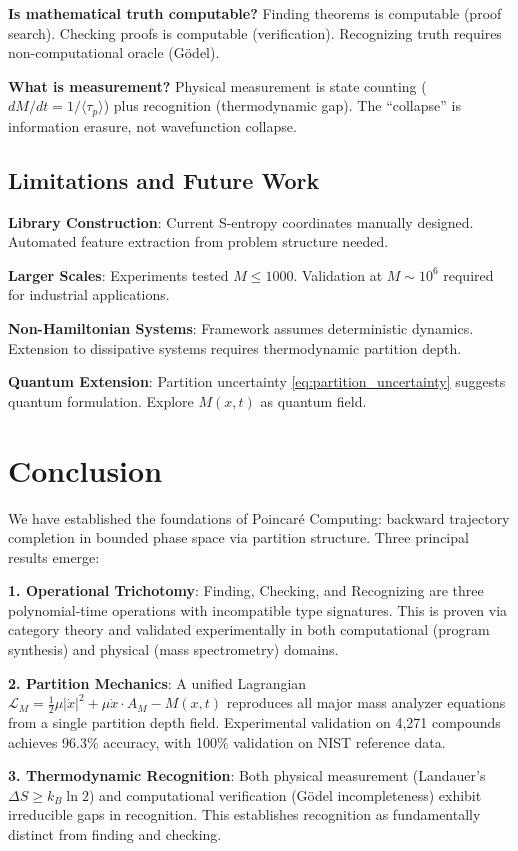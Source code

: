 \documentclass[twocolumn,aps,prl,superscriptaddress,floatfix]{revtex4-2}
\begin{document}
\textbf{Is mathematical truth computable?} Finding theorems is computable (proof search). Checking proofs is computable (verification). Recognizing truth requires non-computational oracle (G\"odel).

\textbf{What is measurement?} Physical measurement is state counting ($dM/dt = 1/\langle \tau_p \rangle$) plus recognition (thermodynamic gap). The ``collapse'' is information erasure, not wavefunction collapse.

\subsection{Limitations and Future Work}

\textbf{Library Construction}: Current S-entropy coordinates manually designed. Automated feature extraction from problem structure needed.

\textbf{Larger Scales}: Experiments tested $M \leq 1000$. Validation at $M \sim 10^6$ required for industrial applications.

\textbf{Non-Hamiltonian Systems}: Framework assumes deterministic dynamics. Extension to dissipative systems requires thermodynamic partition depth.

\textbf{Quantum Extension}: Partition uncertainty \eqref{eq:partition_uncertainty} suggests quantum formulation. Explore $M(x,t)$ as quantum field.

\section{Conclusion}

We have established the foundations of Poincar\'e Computing: backward trajectory completion in bounded phase space via partition structure. Three principal results emerge:

\textbf{1. Operational Trichotomy}: Finding, Checking, and Recognizing are three polynomial-time operations with incompatible type signatures. This is proven via category theory and validated experimentally in both computational (program synthesis) and physical (mass spectrometry) domains.

\textbf{2. Partition Mechanics}: A unified Lagrangian $\mathcal{L}_M = \frac{1}{2}\mu|\dot{x}|^2 + \mu\dot{x}\cdot A_M - M(x,t)$ reproduces all major mass analyzer equations from a single partition depth field. Experimental validation on 4,271 compounds achieves 96.3\% accuracy, with 100\% validation on NIST reference data.

\textbf{3. Thermodynamic Recognition}: Both physical measurement (Landauer's $\Delta S \geq k_B \ln 2$) and computational verification (G\"odel incompleteness) exhibit irreducible gaps in recognition. This establishes recognition as fundamentally distinct from finding and checking.
\end{document}
